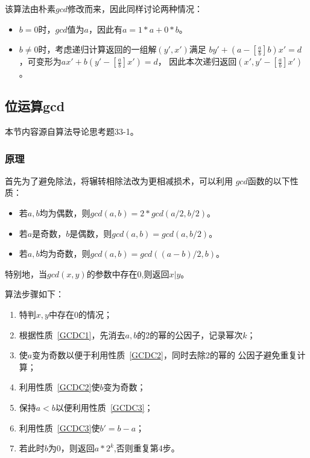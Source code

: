 该算法由朴素$gcd$修改而来，因此同样讨论两种情况：

\begin{itemize}
    \item $b=0$时，$gcd$值为$a$，因此有$a=1*a+0*b$。
    \item $b\neq 0$时，考虑递归计算返回的一组解$(y',x')$满足
    $by'+(a-[\frac{a}{b}]b)x'=d$，可变形为$ax'+b(y'-[\frac{a}{b}]x')=d$，
    因此本次递归返回$(x',y'-[\frac{a}{b}]x')$。
\end{itemize}

\subsection{位运算gcd}

本节内容源自算法导论\cite{ITA3}思考题33-1。

\subsubsection{原理}

首先为了避免除法，将辗转相除法改为更相减损术，可以利用
$gcd$函数的以下性质：

\begin{itemize}
    \item \begin{property}\label{GCDC1}
        若$a,b$均为偶数，则$gcd(a,b)=2*gcd(a/2,b/2)$。
    \end{property}
    \item \begin{property}\label{GCDC2}
        若$a$是奇数，$b$是偶数，则$gcd(a,b)=gcd(a,b/2)$。
    \end{property}
    \item \begin{property}\label{GCDC3}
        若$a,b$均为奇数，则$gcd(a,b)=gcd((a-b)/2,b)$。
    \end{property}
\end{itemize}

特别地，当$gcd(x,y)$的参数中存在0,则返回$x|y$。

算法步骤如下：
\begin{enumerate}
    \item 特判$x,y$中存在0的情况；
    \item 根据性质~\ref{GCDC1}，先消去$a,b$的2的幂的公因子，记录幂次$k$；
    \item 使$a$变为奇数以便于利用性质~\ref{GCDC2}，同时去除2的幂的
    公因子避免重复计算；
    \item 利用性质~\ref{GCDC2}使$b$变为奇数；
    \item 保持$a<b$以便利用性质~\ref{GCDC3}；
    \item 利用性质~\ref{GCDC3}使$b'=b-a$；
    \item 若此时$b$为0，则返回$a*2^k$,否则重复第4步。
\end{enumerate}

